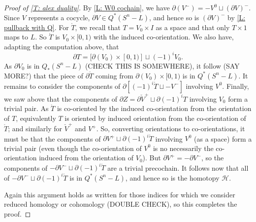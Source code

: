 \documentclass[12pt]{article}
\theoremstyle{plain}
\theoremstyle{definition}
\theoremstyle{remark}
\newcommand{\mr}[1]{\mathring{#1}}
\newcommand{\bd}{\partial}
\newcommand{\mc}[1]{\mathcal{#1}}
\begin{document}
\begin{proof}[Proof of \cref{T: alex duality}]
By \cref{L: W0 cochain}, we have $\bd(V^-) = -V^0 \sqcup (\bd V)^-$.
Since $V$ represents a cocycle, $\bd V \in Q^*(S^n-L)$, and hence so is $(\bd V)^-$ by \cref{L: pullback with Q}.
For $\mr T$, we recall that $T = V_0 \times I$ as a space and that only $T \times 1$ maps to $L$.
So $\mr T$ is $V_0 \times [0,1)$ with the induced co-orientation.
We also have, adapting the computation above, that
$$\bd T = [\bd (V_0) \times [0,1)] \sqcup (-1)^i V_0.$$
As $\bd V_0$ is in $Q_*(S^n-L)$ (CHECK THIS IS SOMEWHERE), it follow (SAY MORE?) that the piece of $\bd \mr T$ coming from $\bd (V_0) \times [0,1)$ is in $Q^*(S^n-L)$.
It remains to consider the components of $\bd[ (-1)^i\mr T \sqcup - V^-]$ involving $V^0$.
Finally, we saw above that the components of $\bd Z = \bd \check V^+ \sqcup \bd (-1)^i T$ involving $V_0$ form a trivial pair.
As $\mr T$ is co-oriented by the induced co-orientation from the orientation of $T$, equivalently $T$ is oriented by induced orientation from the co-orientation of $\mr T$; and similarly for $\check V^+$ and $V^+$.
So, converting orientations to co-orientations, it must be that the components of $\bd V^+ \sqcup \bd (-1)^i \mr T$ involving $V^0$ (as a space) form a trivial pair (even though the co-orientation of $V^0$ is no necessarily the co-orientation induced from the orientation of $V_0$).
But $\bd V^+ = - \bd V^-$, so the components of $-\bd V^- \sqcup \bd (-1)^i \mr T$ are a trivial precochain.
It follows now that all of $-\bd V^- \sqcup \bd (-1)^i \mr T$ is in $Q^*(S^n-L)$, and hence so is the homotopy $\mc H$.

\begin{comment}

we need to consider the co-orientation of the the piece of $\bd \mr T$ corresponding to $V^0$.
We have


Once again,
\begin{itemize}
\item the $V^0$ terms should cancel once I get the signs right,
\item since $\bd V \in Q^*(S^n-L)$ it follows that $(\bd V)^-$ and $\bd V^0=-(\bd V)^0$ are in $Q^*(S^n-L)$,
\item and then $\bd V^0 \times [0,1) \in Q^*(S^n-L)$ since the homotopy is universal.
\end{itemize}
\end{comment}

Again this argument holds as written for those indices for which we consider reduced homology or cohomology (DOUBLE CHECK), so this completes the proof.
\end{proof}
\end{document}

